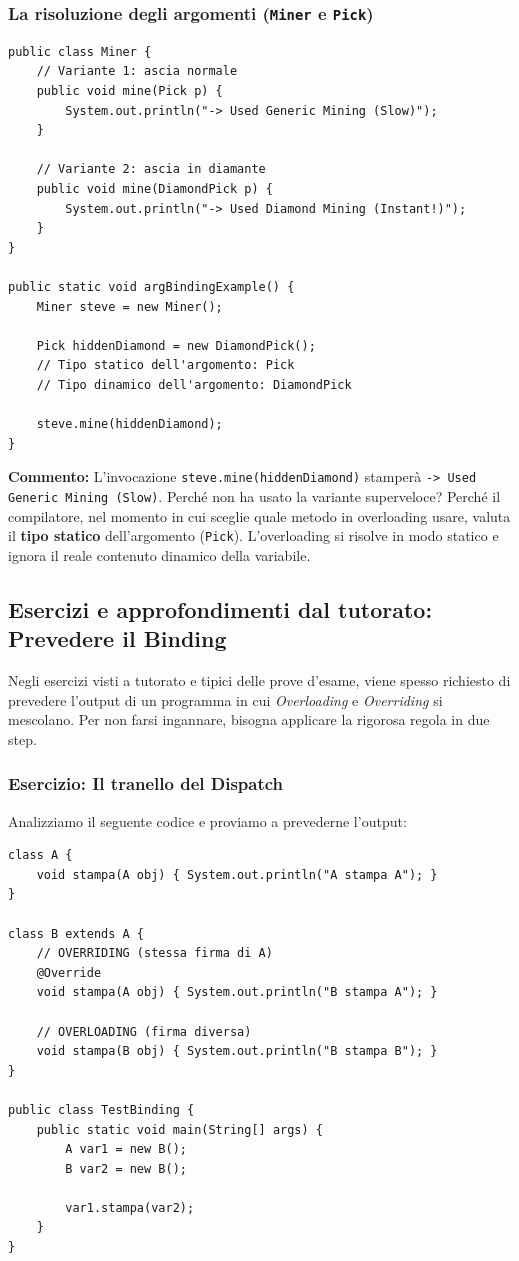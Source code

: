 \documentclass[12pt, a4paper]{article}
\begin{document}
\subsubsection{La risoluzione degli argomenti (\texttt{Miner} e \texttt{Pick})}
\begin{verbatim}
public class Miner {
    // Variante 1: ascia normale
    public void mine(Pick p) {
        System.out.println("-> Used Generic Mining (Slow)");
    }
    
    // Variante 2: ascia in diamante
    public void mine(DiamondPick p) {
        System.out.println("-> Used Diamond Mining (Instant!)");
    }
}

public static void argBindingExample() {
    Miner steve = new Miner();
    
    Pick hiddenDiamond = new DiamondPick();
    // Tipo statico dell'argomento: Pick
    // Tipo dinamico dell'argomento: DiamondPick

    steve.mine(hiddenDiamond); 
}
\end{verbatim}
\textbf{Commento:} L'invocazione \texttt{steve.mine(hiddenDiamond)} stamperà \texttt{-> Used Generic Mining (Slow)}. Perché non ha usato la variante superveloce? Perché il compilatore, nel momento in cui sceglie quale metodo in overloading usare, valuta il \textbf{tipo statico} dell'argomento (\texttt{Pick}). L'overloading si risolve in modo statico e ignora il reale contenuto dinamico della variabile.

\subsection{Esercizi e approfondimenti dal tutorato: Prevedere il Binding}
Negli esercizi visti a tutorato e tipici delle prove d'esame, viene spesso richiesto di prevedere l'output di un programma in cui \textit{Overloading} e \textit{Overriding} si mescolano. Per non farsi ingannare, bisogna applicare la rigorosa regola in due step.

\newpage

\subsubsection{Esercizio: Il tranello del Dispatch}
Analizziamo il seguente codice e proviamo a prevederne l'output:

\begin{verbatim}
class A {
    void stampa(A obj) { System.out.println("A stampa A"); }
}

class B extends A {
    // OVERRIDING (stessa firma di A)
    @Override
    void stampa(A obj) { System.out.println("B stampa A"); }

    // OVERLOADING (firma diversa)
    void stampa(B obj) { System.out.println("B stampa B"); }
}

public class TestBinding {
    public static void main(String[] args) {
        A var1 = new B();
        B var2 = new B();

        var1.stampa(var2); 
    }
}
\end{verbatim}
\end{document}
